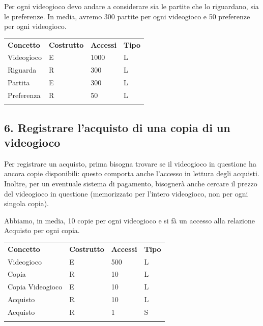 \documentclass[a4paper,12pt]{report}
\begin{document}
Per ogni videogioco devo andare a considerare sia le partite che lo riguardano, sia le preferenze. In media, avremo 300 partite per ogni videogioco e 50 preferenze per ogni videogioco.

\begin{table}[h!]
\begin{center}
	\begin{tabular}{ | m{4cm} P{4cm} P{4cm} P{4cm} | }
	 \textbf{Concetto} & \textbf{Costrutto} & \textbf{Accessi} & \textbf{Tipo} \\
	Videogioco & E & 1000 & L \\ \hline
	Riguarda	   & R & 300 & L \\ \hline
	Partita    & E & 300 & L \\ \hline
	Preferenza & R & 50 & L \\ \hline
          \\ \hline
	\end{tabular}
\end{center}
\end{table}

\newpage

\subsection*{6. Registrare l'acquisto di una copia di un videogioco}

Per registrare un acquisto, prima bisogna trovare se il videogioco in questione ha ancora copie disponibili: questo comporta anche l'accesso in lettura degli acquisti. Inoltre, per un eventuale sistema di pagamento, bisognerà anche cercare il prezzo del videogioco in questione (memorizzato per l'intero videogioco, non per ogni singola copia).

Abbiamo, in media, 10 copie per ogni videogioco e si fà un accesso alla relazione Acquisto per ogni copia.

\begin{table}[h!]
\begin{center}
	\begin{tabular}{ | m{4cm} P{4cm} P{4cm} P{4cm} | }
	 \textbf{Concetto} & \textbf{Costrutto} & \textbf{Accessi} & \textbf{Tipo} \\
	Videogioco		 & E & 500 & L \\ \hline
	Copia			 & R & 10  & L \\ \hline	
	Copia Videogioco & E & 10  & L \\ \hline
	Acquisto 		 & R & 10  & L \\ \hline
	Acquisto 		 & R & 1   & S \\ \hline
      \\ \hline
	\end{tabular}
\end{center}
\end{table}
\end{document}
